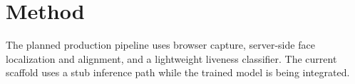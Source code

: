 \section{Method}
The planned production pipeline uses browser capture, server-side face localization and alignment, and a lightweight liveness classifier. The current scaffold uses a stub inference path while the trained model is being integrated.
